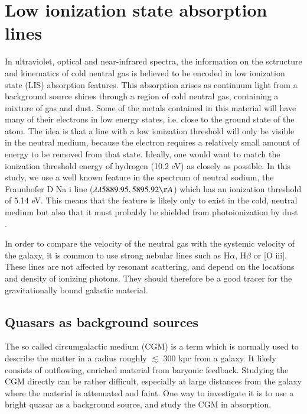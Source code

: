 \documentclass[a4wide,12pt]{book}
\begin{document}
{\section{Low ionization state absorption lines}\label{Sec:LIS}

In ultraviolet, optical and near-infrared spectra, the information on the sctructure and kinematics of cold neutral gas is believed to be encoded in low ionization state (LIS) absorption features. This absorption arises as continuum light from a background source shines through a region of cold neutral gas, containing a mixture of gas and dust. Some of the metals contained in this material will have many of their electrons in low energy states, i.e. close to the ground state of the atom. The idea is that a line with a low ionization threshold will only be visible in the neutral medium, because the electron requires a relatively small amount of energy to be removed from that state. Ideally, one would want to match the ionization threshold energy of hydrogen (10.2 eV) as closely as possible. In this study, we use a well known feature in the spectrum of neutral sodium, the Fraunhofer D Na {\sc i} line ($\lambda \lambda 5889.95, 5895.92 \AA$) which has an ionization threshold of 5.14 eV. This means that the feature is likely only to exist in the cold, neutral medium but also that it must probably be shielded from photoionization by dust \citep{murray-2007}.

In order to compare the velocity of the neutral gas with the systemic velocity of the galaxy, it is common to use strong nebular lines such as H$\alpha$, H$\beta$ or [O {\sc iii}]. These lines are not affected by resonant scattering, and depend on the locations and density of ionizing photons. They should therefore be a good tracer for the gravitationally bound galactic material. 

\subsection{Quasars as background sources}

The so called circumgalactic medium (CGM) is a term which is normally used to describe the matter in a radius roughly $\lesssim$ 300 kpc from a galaxy. It likely consists of outflowing, enriched material from baryonic feedback. Studying the CGM directly can be rather difficult, especially at large distances from the galaxy where the material is attenuated and faint. One way to investigate it is to use a bright quasar as a background source, and study the CGM in absorption. 

}
\end{document}
